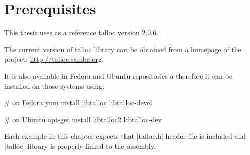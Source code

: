 \section{Prerequisites}
\label{talloc:prerequisites}

This thesis uses as a reference talloc version 2.0.6.

The current version of talloc library can be obtained from a homepage of the
project: {\footnotesize\url{http://talloc.samba.org}}.

It is also available in Fedora and Ubuntu repositories a therefore it can be
installed on those systems using:

\begin{commandline}
# on Fedora
yum install libtalloc libtalloc-devel

# on Ubuntu
apt-get install libtalloc2 libtalloc-dev
\end{commandline}
\funclistend
Each example in this chapter expects that |talloc.h| header file is included and
|talloc| library is properly linked to the assembly.
